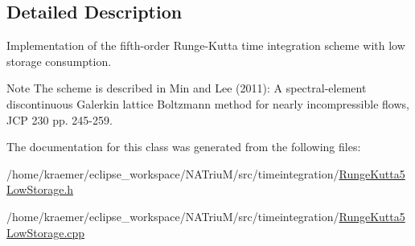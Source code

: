 \subsection{\-Detailed \-Description}
\-Implementation of the fifth-\/order \-Runge-\/\-Kutta time integration scheme with low storage consumption. 

\begin{DoxyNote}{\-Note}
\-The scheme is described in \-Min and \-Lee (2011)\-: \-A spectral-\/element discontinuous \-Galerkin lattice \-Boltzmann method for nearly incompressible flows, \-J\-C\-P 230 pp. 245-\/259. 
\end{DoxyNote}


\-The documentation for this class was generated from the following files\-:\begin{DoxyCompactItemize}
\item 
/home/kraemer/eclipse\-\_\-workspace/\-N\-A\-Triu\-M/src/timeintegration/\hyperlink{RungeKutta5LowStorage_8h}{\-Runge\-Kutta5\-Low\-Storage.\-h}\item 
/home/kraemer/eclipse\-\_\-workspace/\-N\-A\-Triu\-M/src/timeintegration/\hyperlink{RungeKutta5LowStorage_8cpp}{\-Runge\-Kutta5\-Low\-Storage.\-cpp}\end{DoxyCompactItemize}

